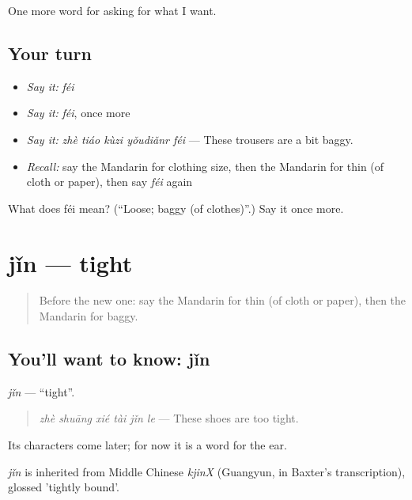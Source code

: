 \begin{grammarlens}[title={What you've built}]
One more word for asking for what I want.
\end{grammarlens}

\subsection*{Your turn}
\begin{itemize}
\raggedright
  \item \emph{Say it:} \emph{féi}
  \item \emph{Say it:} \emph{féi}, once more
  \item \emph{Say it:} \emph{zhè tiáo kùzi yǒudiǎnr féi} — These trousers are a bit baggy.
  \item \emph{Recall:} say the Mandarin for clothing size, then the Mandarin for thin (of cloth or paper), then say \emph{féi} again
\end{itemize}

\begin{tcolorbox}[breakable,colback=teal!4,colframe=teal!35!black,title={Before you move on}]
What does féi mean? (\textquotedblleft{}Loose; baggy (of clothes)\textquotedblright{}.) Say it once more.
\end{tcolorbox}
\section[jǐn]{jǐn — tight}

\label{lesson:ZH-C199-jin}



\begin{quote}
Before the new one: say the Mandarin for thin (of cloth or paper), then the Mandarin for baggy.
\end{quote}

\subsection*{You'll want to know: jǐn}
\emph{jǐn} — \textquotedblleft{}tight\textquotedblright{}.

\begin{quote}
\emph{zhè shuāng xié tài jǐn le} — These shoes are too tight.
\end{quote}

Its characters come later; for now it is a word for the ear.

\begin{cousinweb}
\emph{jǐn} is inherited from Middle Chinese \emph{kjinX} (Guangyun, in Baxter's transcription), glossed 'tightly bound'.
\end{cousinweb}

